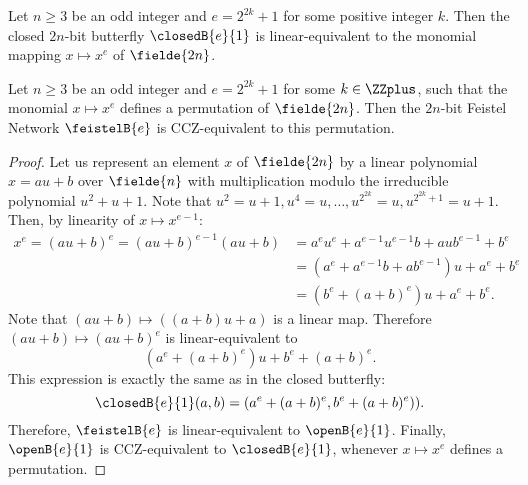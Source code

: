 \begin{theorem}
  Let $n \ge 3$ be an odd integer and $e = 2^{2k}+1$ for some positive integer $k$. Then the closed $2n$-bit butterfly $\closedB{e}{1}$ is linear-equivalent to the monomial mapping $x \mapsto x^e$ of $\fielde{2n}$.
\end{theorem}
\begin{corollary}
  Let $n \geq 3$ be an odd integer and $e = 2^{2k}+1$ for some $k \in \ZZplus$, such that the monomial $x \mapsto x^e$ defines a permutation of $\fielde{2n}$. Then the $2n$-bit Feistel Network $\feistelB{e}$ is CCZ-equivalent to this permutation.
\end{corollary}
\begin{proof}
Let us represent an element $x$ of $\fielde{2n}$ by a linear polynomial $x = au + b$ over $\fielde{n}$ with multiplication modulo the irreducible polynomial $u^2 + u + 1$. Note that $u^2 = u + 1, u^4 = u, \ldots, u^{2^{2k}} = u, u^{2^{2k}+1} = u + 1$. Then, by linearity of $x \mapsto x^{e-1}$:
    \begin{align*}
        x^e = (au + b)^e = (au+b)^{e-1}(au+b)
            &= a^{e}u^{e} + a^{e-1}u^{e-1}b + aub^{e-1} + b^{e}\\
            &= (a^{e} + a^{e-1}b + ab^{e-1})u + a^{e} + b^{e}\\
            &= (b^{e} + (a + b)^{e})u + a^{e} + b^{e}.
    \end{align*}
    Note that $(au + b) \mapsto ((a + b)u + a)$ is a linear map. Therefore $(au+b) \mapsto (au+b)^e$ is linear-equivalent to 
    $$(a^{e} + (a+b)^{e})u + b^{e} + (a+b)^{e}.$$
    This expression is exactly the same as in the closed butterfly:
    $$
    \closedB{e}{1}(a, b) = (a^e + (a+b)^e, b^e + (a+b)^e)).
    $$
    Therefore, $\feistelB{e}$ is linear-equivalent to $\openB{e}{1}$. Finally, $\openB{e}{1}$ is CCZ-equivalent to $\closedB{e}{1}$, whenever $x \mapsto x^e$ defines a permutation.
\end{proof}




